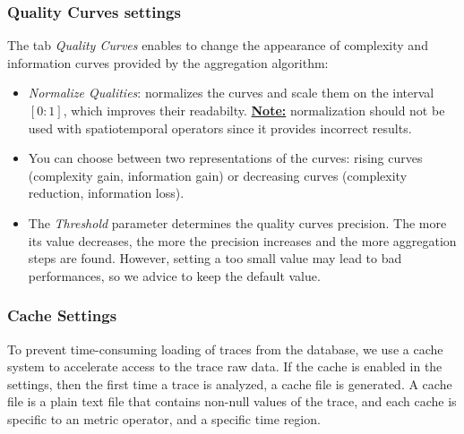 \documentclass[twoside]{article}
\begin{document}
\begin{sloppypar}
\subsubsection{Quality Curves settings}
The tab \textit{Quality Curves} enables to change the appearance of complexity and information curves provided by the aggregation algorithm:
\begin{itemize}
	\item \textit{Normalize Qualities}: normalizes the curves and scale them on the interval $[0:1]$, which improves their readabilty. \underline{\textbf{Note:}} normalization should not be used with spatiotemporal operators since it provides incorrect results.
    \item You can choose between two representations of the curves: rising curves (complexity gain, information gain) or decreasing curves (complexity reduction, information loss).
    \item The \textit{Threshold} parameter determines the quality curves precision. The more its value decreases, the more the precision increases and the more aggregation steps are found. However, setting a too small value may lead to bad performances, so we advice to keep the default value.
\end{itemize}

\subsubsection{Cache Settings}
To prevent time-consuming loading of traces from the database, we use a cache system to accelerate access to the trace raw data. If the cache is enabled in the settings, then the first time a trace is analyzed, a cache file is generated. A cache file is a plain text file that contains non-null values of the trace, and each cache is specific to an metric operator, and a specific time region.


\end{sloppypar}
\end{document}
